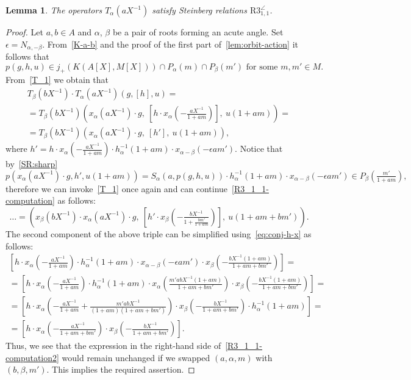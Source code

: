 \documentclass[oneside, 8pt]{amsart}
\newtheorem{lemma}{Lemma}
\theoremstyle{remark}
\theoremstyle{definition}
\numberwithin{lemma}{section}
\numberwithin{prop}{section}
\numberwithin{corollary}{section}
\numberwithin{externaltheorem}{section}
\numberwithin{equation}{section}
\begin{document}
\begin{lemma} \label{R3_1_1} The operators $T_\alpha(aX^{-1})$ satisfy Steinberg relations $\mathrm{R3}_{1,1}^{\angle}$. \end{lemma}
\begin{proof}
Let $a, b \in A$ and $\alpha$, $\beta$ be a pair of roots forming an acute angle. Set $\epsilon = N_{\alpha,-\beta}$. From~\cref{K-a-b} and the proof of the first part of~\cref{lem:orbit-action} it follows that \[p(g, h, u) \in j_+\left(K(A[X], M[X])\right) \cap P_\alpha(m) \cap P_{\beta}(m')\text{ for some }m,m' \in M.\]
From~\eqref{T_1} we obtain that
\begin{multline} \label{R3_1_1-computation}
 T_\beta(bX^{-1}) \cdot T_\alpha(aX^{-1}) \left(g, [h], u\right) = \\
 = T_\beta(bX^{-1}) \left(x_\alpha(aX^{-1})\cdot g,\ \left[h \cdot x_\alpha\left(-\tfrac{aX^{-1}}{1 + am}\right)\right],\ u(1 + am)\right) = \\ 
 = T_\beta(bX^{-1}) \left(x_\alpha(aX^{-1})\cdot g,\ \left[h'\right],\ u(1 + am)\right),
 \end{multline}
where $h' = h \cdot x_\alpha\left(-\tfrac{aX^{-1}}{1 + am}\right) \cdot h^{-1}_\alpha(1 + am) \cdot x_{\alpha-\beta}(-\epsilon am').$
Notice that by~\cref{SR:sharp}
\[ p\left(x_\alpha(aX^{-1})\cdot g, h', u(1 + am)\right) = S_\alpha(a, p(g, h, u)) \cdot h^{-1}_\alpha(1 + am) \cdot x_{\alpha-\beta}(-\epsilon am') \in P_\beta(\tfrac{m'}{1+am}), \]
therefore we can invoke~\eqref{T_1} once again and can continue~\eqref{R3_1_1-computation} as follows:
\begin{equation}\label{R3_1_1-computation2} \ldots = \left(x_\beta(bX^{-1}) \cdot x_\alpha(aX^{-1}) \cdot g,\ \left[h' \cdot x_\beta\left(-\tfrac{bX^{-1}}{1 + \tfrac{bm'}{1+am}}\right)\right],\ u(1 + am + bm')\right). \end{equation}
The second component of the above triple can be simplified using~\eqref{eq:conj-h-x} as follows:
\begin{multline*}
 \left[ h \cdot x_\alpha\left(-\tfrac{aX^{-1}}{1 + am}\right) \cdot h^{-1}_\alpha(1 + am) \cdot x_{\alpha-\beta}(-\epsilon am') \cdot x_\beta\left(-\tfrac{bX^{-1}(1+am)}{1 + am + bm'}\right)\right] = \\
 = \left[ h \cdot x_\alpha\left(-\tfrac{aX^{-1}}{1 + am}\right) \cdot h^{-1}_\alpha(1 + am) \cdot x_{\alpha}\left(\tfrac{m'abX^{-1}(1+am)}{1 + am + bm'}\right) \cdot x_\beta\left(-\tfrac{bX^{-1}(1+am)}{1 + am + bm'}\right)\right] = \\
 = \left[ h \cdot x_\alpha\left(-\tfrac{aX^{-1}}{1 + am} + \tfrac{m'abX^{-1}}{(1+am)(1 + am + bm')}\right) \cdot x_\beta\left(-\tfrac{bX^{-1}}{1 + am + bm'}\right) \cdot h^{-1}_\alpha(1 + am)\right] = \\
 = \left[ h \cdot x_\alpha\left(-\tfrac{aX^{-1}}{1 + am + bm'}\right) \cdot x_\beta\left(-\tfrac{bX^{-1}}{1 + am + bm'}\right)\right].
\end{multline*}
Thus, we see that the expression in the right-hand side of~\eqref{R3_1_1-computation2} would remain unchanged if we swapped $(a,\alpha,m)$ with $(b,\beta,m')$. This implies the required assertion.
\end{proof}
\end{document}
